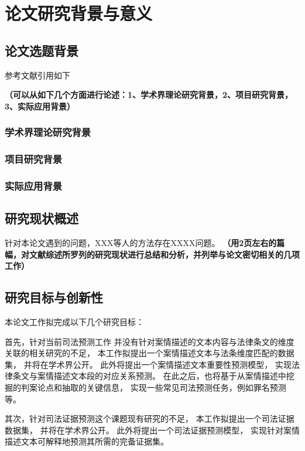 \section{论文研究背景与意义}

\subsection{论文选题背景}
参考文献引用如下

\textbf{\color{red}（可以从如下几个方面进行论述：1、学术界理论研究背景，2、项目研究背景，3、实际应用背景）}
\subsubsection{学术界理论研究背景}

\subsubsection{项目研究背景}

\subsubsection{实际应用背景}



\subsection{研究现状概述}

针对本论文遇到的问题，XXX等人的方法存在XXXX问题。
\textbf{\color{red}
（用2页左右的篇幅，对文献综述所罗列的研究现状进行总结和分析，并列举与论文密切相关的几项工作）}



\subsection{研究目标与创新性}
本论文工作拟完成以下几个研究目标：

首先，针对当前司法预测工作
并没有针对案情描述的文本内容与法律条文的维度关联的相关研究的不足，
本工作拟提出一个案情描述文本与法条维度匹配的数据集，
并将在学术界公开。
此外将提出一个案情描述文本重要性预测模型，
实现法律条文与案情描述文本段的对应关系预测。
在此之后，也将基于从案情描述中挖掘的判案论点和抽取的关键信息，
实现一些常见司法预测任务，例如罪名预测等。

其次，针对司法证据预测这个课题现有研究的不足，
本工作拟提出一个司法证据数据集，
并将在学术界公开。
此外将提出一个司法证据预测模型，
实现针对案情描述文本可解释地预测其所需的完备证据集。

